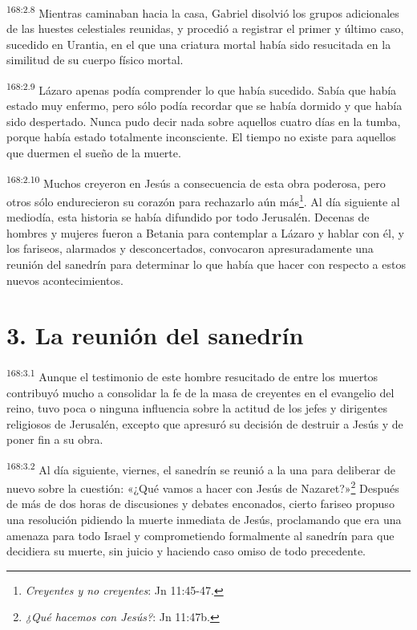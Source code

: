 \par 
\textsuperscript{168:2.8} Mientras caminaban hacia la casa, Gabriel disolvió los grupos adicionales de las huestes celestiales reunidas, y procedió a registrar el primer y último caso, sucedido en Urantia, en el que una criatura mortal había sido resucitada en la similitud de su cuerpo físico mortal.

\par 
\textsuperscript{168:2.9} Lázaro apenas podía comprender lo que había sucedido. Sabía que había estado muy enfermo, pero sólo podía recordar que se había dormido y que había sido despertado. Nunca pudo decir nada sobre aquellos cuatro días en la tumba, porque había estado totalmente inconsciente. El tiempo no existe para aquellos que duermen el sueño de la muerte.

\par 
\textsuperscript{168:2.10} Muchos creyeron en Jesús a consecuencia de esta obra poderosa, pero otros sólo endurecieron su corazón para rechazarlo aún más\footnote{\textit{Creyentes y no creyentes}: Jn 11:45-47.}. Al día siguiente al mediodía, esta historia se había difundido por todo Jerusalén. Decenas de hombres y mujeres fueron a Betania para contemplar a Lázaro y hablar con él, y los fariseos, alarmados y desconcertados, convocaron apresuradamente una reunión del sanedrín para determinar lo que había que hacer con respecto a estos nuevos acontecimientos.

\section*{3. La reunión del sanedrín}
\par 
\textsuperscript{168:3.1} Aunque el testimonio de este hombre resucitado de entre los muertos contribuyó mucho a consolidar la fe de la masa de creyentes en el evangelio del reino, tuvo poca o ninguna influencia sobre la actitud de los jefes y dirigentes religiosos de Jerusalén, excepto que apresuró su decisión de destruir a Jesús y de poner fin a su obra.

\par 
\textsuperscript{168:3.2} Al día siguiente, viernes, el sanedrín se reunió a la una para deliberar de nuevo sobre la cuestión: «¿Qué vamos a hacer con Jesús de Nazaret?»\footnote{\textit{¿Qué hacemos con Jesús?}: Jn 11:47b.} Después de más de dos horas de discusiones y debates enconados, cierto fariseo propuso una resolución pidiendo la muerte inmediata de Jesús, proclamando que era una amenaza para todo Israel y comprometiendo formalmente al sanedrín para que decidiera su muerte, sin juicio y haciendo caso omiso de todo precedente.

